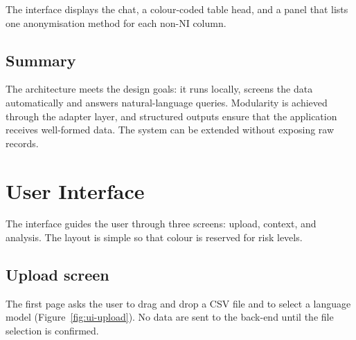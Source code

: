 \documentclass{article}
\begin{document}
The interface displays the chat, a colour-coded table head, and a panel that lists one anonymisation method for each non-NI column.

\subsection{Summary}

The architecture meets the design goals: it runs locally, screens the data automatically and answers natural-language queries.  
Modularity is achieved through the adapter layer, and structured outputs ensure that the application receives well-formed data.  
The system can be extended without exposing raw records.

\section{User Interface}
\label{sec:ui}

The interface guides the user through three screens: upload, context, and analysis.  
The layout is simple so that colour is reserved for risk levels.

\subsection{Upload screen}

The first page asks the user to drag and drop a CSV file and to select a language model (Figure~\ref{fig:ui-upload}).  
No data are sent to the back-end until the file selection is confirmed.
\end{document}
